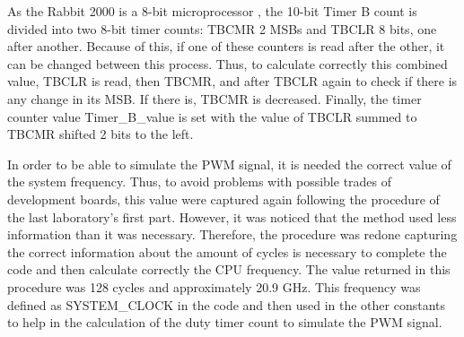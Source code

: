 As the Rabbit 2000 is a 8-bit microprocessor \cite{Digi_International_2007}, the 10-bit Timer B count is divided into two 8-bit timer counts: TBCMR 2 MSBs and TBCLR 8 bits, one after another. Because of this, if one of these counters is read after the other, it can be changed between this process. Thus, to calculate correctly this combined value, TBCLR is read, then TBCMR, and after TBCLR again to check if there is any change in its MSB. If there is, TBCMR is decreased. Finally, the timer counter value Timer\_B\_value is set with the value of TBCLR summed to TBCMR shifted 2 bits to the left. 

In order to be able to simulate the PWM signal, it is needed the correct value of the system frequency. Thus, to avoid problems with possible trades of development boards, this value were captured again following the procedure of the last laboratory's first part. However, it was noticed that the method used less information than it was necessary. Therefore, the procedure was redone capturing the correct information about the amount of cycles is necessary to complete the code and then calculate correctly the CPU frequency. The value returned in this procedure was 128 cycles and approximately 20.9 GHz. This frequency was defined as SYSTEM\_CLOCK in the code and then used in the other constants to help in the calculation of the duty timer count to simulate the PWM signal.